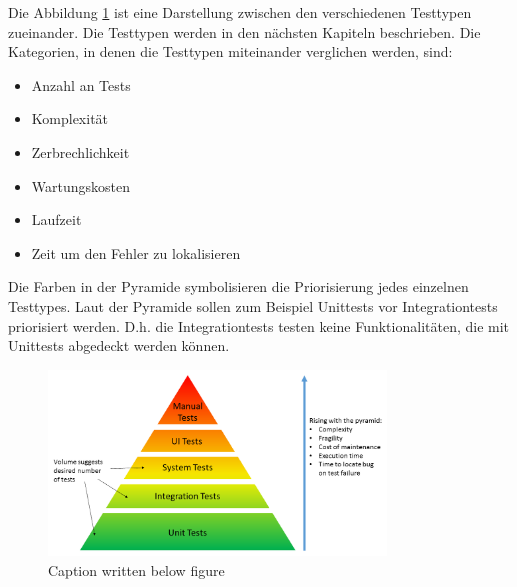 Die Abbildung \ref{fig:TestingPyramide} ist eine Darstellung zwischen den verschiedenen Testtypen zueinander.
Die Testtypen werden in den nächsten Kapiteln beschrieben. 
Die Kategorien, in denen die Testtypen miteinander verglichen werden, sind:
\begin{itemize}
    \item Anzahl an Tests
    \item Komplexität
    \item Zerbrechlichkeit
    \item Wartungskosten
    \item Laufzeit
    \item Zeit um den Fehler zu lokalisieren
\end{itemize} 
Die Farben in der Pyramide symbolisieren die Priorisierung jedes einzelnen Testtypes.
Laut der Pyramide sollen zum Beispiel Unittests vor Integrationtests priorisiert werden.
D.h. die Integrationtests testen keine Funktionalitäten, die mit Unittests abgedeckt werden können. 


\begin{figure}[H]
    \centering
    \includegraphics[width=0.8\textwidth]{Images/test_pyramid.png}
    \caption[Testing Pyramide]{Caption written below figure \footnotemark}
    \label{fig:TestingPyramide}
\end{figure}
